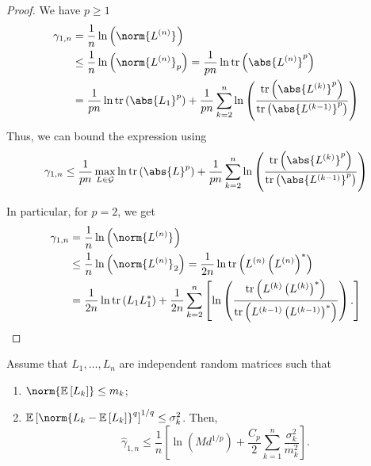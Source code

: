 \begin{proof}
    We have \( p\geq 1 \)
    \begin{align*}
      \gamma_{1,n} &= \frac{1}{n} \operatorname{ln}\left(\norm{L^{(n)}}_{}\right) \\
                   & \leq \frac{1}{n} \operatorname{ln}\left(\norm{L^{(n)}}_{p}\right) = \frac{1}{pn} \operatorname{ln} \operatorname{tr}\left(\abs{L^{(n)}}^{p}\right) \\
                   & = \frac{1}{pn} \operatorname{ln} \operatorname{tr}\left(\abs{L_1}^{p}\right) + \frac{1}{pn}\sum_{k=2}^{n} \operatorname{ln} \left(\frac{\operatorname{tr}\left(\abs{L^{(k)}}^{p}\right)}{\operatorname{tr}\left( \abs{L^{(k-1)}}^{p}\right)}\right)
    \end{align*}
   Thus, we can bound the expression using 
   \begin{align*}
       \gamma_{1,n} \leq \frac{1}{pn} \max_{L\in \mathcal{G} } \operatorname{ln} \operatorname{tr}\left(\abs{L}^{p}\right) + \frac{1}{pn}\sum_{k=2}^{n} \operatorname{ln} \left(\frac{\operatorname{tr}\left(\abs{L^{(k)}}^{p}\right)}{\operatorname{tr}\left( \abs{L^{(k-1)}}^{p}\right)}\right)
   \end{align*}

In particular, for \( p=2 \), we get 
    \begin{align*}
      \gamma_{1,n} &= \frac{1}{n} \operatorname{ln}\left( \norm{L^{(n)}}_{}\right) \\
                   &\leq \frac{1}{n} \operatorname{ln}\left(\norm{L^{(n)}}_{2}\right) = \frac{1}{2n} \operatorname{ln} \operatorname{tr}\left(L^{(n)} \left(L^{(n)}\right)^{*}\right) \\
                   &= \frac{1}{2n} \operatorname{ln}\operatorname{tr}\left(L_{1} L_{1}^*\right) + \frac{1}{2n} \sum_{k=2}^{n} \left[\operatorname{ln}\left(\frac{\operatorname{tr}\left(L^{(k)}\left(L^{(k)}\right)^{*}\right)}{\operatorname{tr}\left(L^{(k-1)}\left(L^{(k-1)}\right)^{*}\right)}\right).\right]
    \end{align*} 
\end{proof}


\begin{lem}
    Assume that \( L_1, \dots, L_n \) are independent random matrices such that 
    \begin{enumerate}[1)]
      \item \(  \norm{\mathbb{E}\left[L_k\right]} \leq m_k \);
      \item \( \mathbb{E} \left[ \norm{L_k-\mathbb{E}\left[L_k\right]}_{}^{q}\right]^{1/q} \leq \sigma_k^{2} \).
        Then, 
        \[ \widehat{\gamma }_{1,n} \leq \frac{1}{n}\left[\operatorname{ln}\left(Md^{1/p}\right) + \frac{C_p}{2} \sum_{k=1}^{n} \frac{\sigma_k^{2}}{m_k^{2}}\right]. \]
    \end{enumerate}
    
\end{lem}

